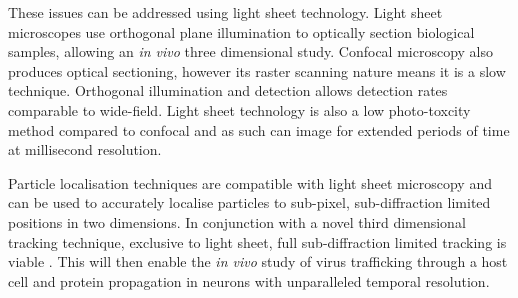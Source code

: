 These issues can be addressed using light sheet technology. Light sheet microscopes use orthogonal plane illumination to optically section biological samples, allowing an \textit{in vivo} three dimensional study. Confocal microscopy also produces optical sectioning, however its raster scanning nature means it is a slow technique. Orthogonal illumination and detection allows detection rates comparable to wide-field. Light sheet technology is also a low photo-toxcity method compared to confocal and as such can image for extended periods of time at millisecond resolution.

Particle localisation techniques are compatible with light sheet microscopy and can be used to accurately localise particles to sub-pixel, sub-diffraction limited positions in two dimensions. In conjunction with a novel third dimensional tracking technique, exclusive to light sheet, full sub-diffraction limited tracking is viable \cite{Spille2015a}. This will then enable the \textit{in vivo} study of virus trafficking through a host cell and protein propagation in neurons with unparalleled temporal resolution.











